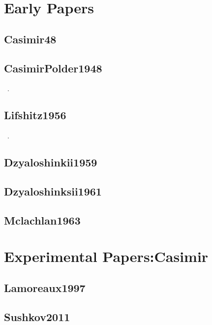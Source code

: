 \section{Early Papers}

\subsection{Casimir48}


\cite{Casimir1948}

\subsection{CasimirPolder1948}


~\cite{CasimirPolder1948}.  

\subsection{Lifshitz1956}

~\cite{Lifshitz1956}.  

\subsection{Dzyaloshinkii1959}

\cite{Dzyaloshinskii1959}
\subsection{Dzyaloshinksii1961}

\cite{Dzyaloshinskii1961}

\subsection{Mclachlan1963}

\cite{Mclachlan1963}

\section{Experimental Papers:Casimir}

\subsection{Lamoreaux1997}

\cite{Lamoreaux1997}
\subsection{Sushkov2011}

